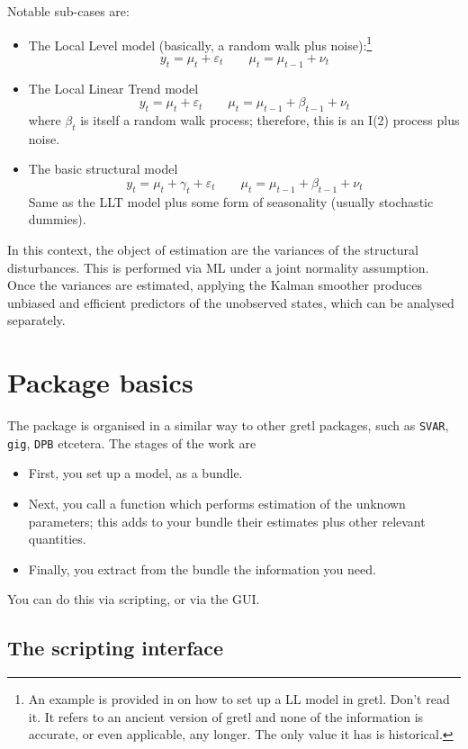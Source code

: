 \documentclass[a4paper,10pt]{article}
\begin{document}
Notable sub-cases are:
\begin{itemize}
\item The Local Level model (basically, a random walk plus
  noise):\footnote{An example is provided in \cite{Jack2011} on how to
    set up a LL model in gretl. Don't read it. It refers to an
    ancient version of gretl and none of the information is accurate,
    or even applicable, any longer. The only value it has is
    historical.}
\[
y_t = \mu_t + \varepsilon_t \qquad  \mu_t = \mu_{t-1} + \nu_t
\]
\item The Local Linear Trend model
\[
y_t = \mu_t + \varepsilon_t \qquad  \mu_t = \mu_{t-1} + \beta_{t-1} + \nu_t
\]
where $\beta_t$ is itself a random walk process; therefore, this is an
I(2) process plus noise.
\item The basic structural model 
\[
y_t = \mu_t + \gamma_t + \varepsilon_t \qquad  \mu_t = \mu_{t-1} + \beta_{t-1} + \nu_t
\]
Same as the LLT model plus some form of seasonality (usually
stochastic dummies).
\end{itemize}

In this context, the object of estimation are the variances of the
structural disturbances. This is performed via ML under a joint
normality assumption. Once the variances are estimated, applying the
Kalman smoother produces unbiased and efficient predictors of the
unobserved states, which can be analysed separately.

\section{Package basics}

The package is organised in a similar way to other gretl packages,
such as \texttt{SVAR}, \texttt{gig}, \texttt{DPB} etcetera. The stages
of the work are 
\begin{itemize}
\item First, you set up a model, as a bundle.
\item Next, you call a function which performs estimation of the unknown
  parameters; this adds to your bundle their estimates plus other
  relevant quantities.
\item Finally, you extract from the bundle the information you need.
\end{itemize}

You can do this via scripting, or via the GUI.

\subsection{The scripting interface}
\end{document}
